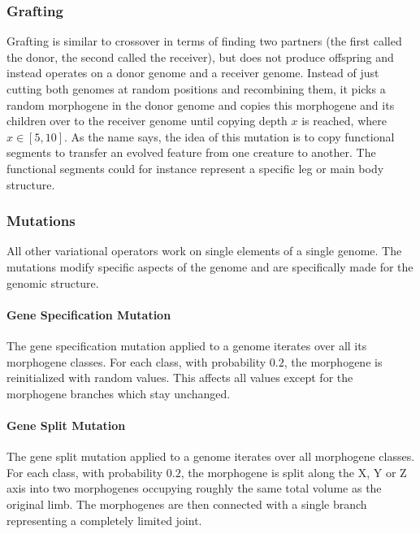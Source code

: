 \documentclass[main]{subfiles}
\begin{document}
\subsubsection{Grafting}

Grafting is similar to crossover in terms of finding two partners (the first called the donor, the second called the receiver), but does not produce offspring and instead operates on a donor genome and a receiver genome. %
%
Instead of just cutting both genomes at random positions and recombining them, it picks a random morphogene in the donor genome and copies this morphogene and its children over to the receiver genome until copying depth $x$ is reached, where $x \in [5,10]$. %
%
As the name says, the idea of this mutation is to copy functional segments to transfer an evolved feature from one creature to another. %
%
The functional segments could for instance represent a specific leg or main body structure.

\subsubsection{Mutations}

All other variational operators work on single elements of a single genome. %
%
The mutations modify specific aspects of the genome and are specifically made for the genomic structure.

\paragraph{Gene Specification Mutation}

The gene specification mutation applied to a genome iterates over all its morphogene classes. %
%
For each class, with probability $0.2$, the morphogene is reinitialized with random values. %
%
This affects all values except for the morphogene branches which stay unchanged.

\paragraph{Gene Split Mutation}

The gene split mutation applied to a genome iterates over all morphogene classes. %
%
For each class, with probability $0.2$, the morphogene is split along the X, Y or Z axis into two morphogenes occupying roughly the same total volume as the original limb. %
%
The morphogenes are then connected with a single branch representing a completely limited joint.
\end{document}
